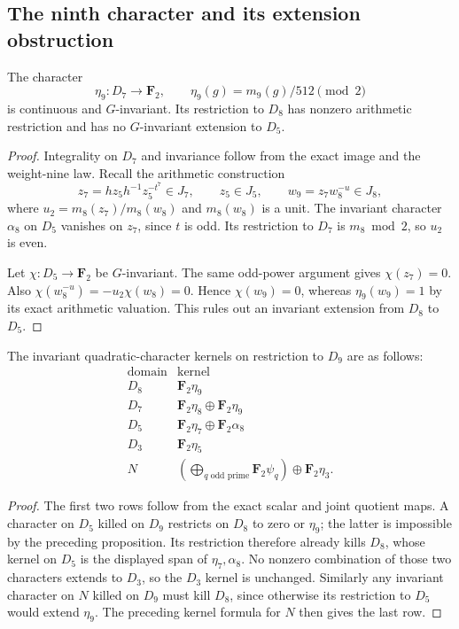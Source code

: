 \subsection{The ninth character and its extension obstruction}

\begin{proposition}\label{prop:eta-nine-nonextension}
The character
\[
 \eta_9:D_7\longrightarrow\mathbf F_2,\qquad
 \eta_9(g)=m_9(g)/512\pmod2
\]
is continuous and $G$-invariant. Its restriction to $D_8$ has
nonzero arithmetic restriction and has no $G$-invariant extension
to $D_5$.
\end{proposition}

\begin{proof}
Integrality on $D_7$ and invariance follow from the exact image
and the weight-nine law. Recall the arithmetic construction
\[
 z_7=h z_5h^{-1}z_5^{-t^7}\in J_7,
 \qquad z_5\in J_5,
 \qquad w_9=z_7w_8^{-u}\in J_8,
\]
where $u_2=m_8(z_7)/m_8(w_8)$ and $m_8(w_8)$ is a unit.
The invariant character $\alpha_8$ on $D_5$ vanishes on $z_7$,
since $t$ is odd. Its restriction to $D_7$ is $m_8\bmod2$, so
$u_2$ is even.

Let $\chi:D_5\to\mathbf F_2$ be $G$-invariant. The same odd-power
argument gives $\chi(z_7)=0$. Also
$\chi(w_8^{-u})=-u_2\chi(w_8)=0$. Hence $\chi(w_9)=0$, whereas
$\eta_9(w_9)=1$ by its exact arithmetic valuation. This rules out
an invariant extension from $D_8$ to $D_5$.
\end{proof}

\begin{corollary}\label{cor:weight-nine-character-kernels}
The invariant quadratic-character kernels on restriction to $D_9$
are as follows:
\[
\begin{array}{c|l}
 \text{domain}&\text{kernel}\\ \hline
 D_8&\mathbf F_2\eta_9\\
 D_7&\mathbf F_2\eta_8\oplus\mathbf F_2\eta_9\\
 D_5&\mathbf F_2\eta_7\oplus\mathbf F_2\alpha_8\\
 D_3&\mathbf F_2\eta_5\\
 N&\displaystyle\left(\bigoplus_{q\text{ odd prime}}\mathbf F_2\psi_q\right)
          \oplus\mathbf F_2\eta_3.
\end{array}
\]
\end{corollary}

\begin{proof}
The first two rows follow from the exact scalar and joint quotient
maps. A character on $D_5$ killed on $D_9$ restricts on $D_8$ to
zero or $\eta_9$; the latter is impossible by the preceding
proposition. Its restriction therefore already kills $D_8$,
whose kernel on $D_5$ is the displayed span of $\eta_7,\alpha_8$.
No nonzero combination of those two characters extends to $D_3$,
so the $D_3$ kernel is unchanged. Similarly any invariant character
on $N$ killed on $D_9$ must kill $D_8$, since otherwise its
restriction to $D_5$ would extend $\eta_9$. The preceding kernel
formula for $N$ then gives the last row.
\end{proof}
